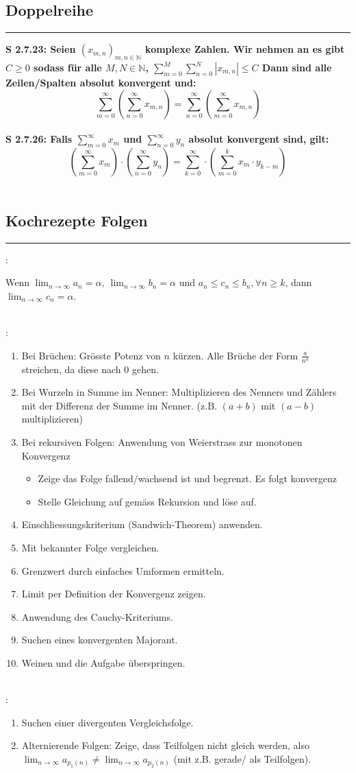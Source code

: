 \documentclass[7pt,landscape, margin = 0.1mm]{article}
\def\limn{\lim_{n\to \infty}}
\newcommand*{\mysubsection}[1]{\vspace{-2mm}\color{chaptercolor}\subsection{ #1 }
\vspace{-1mm}\hrule\vspace{1.5mm}\color{black}
\vspace{2mm}}
\newcommand{\KRZ}[2]{\vspace{1mm} \hline \vspace{1mm} \color{chaptercolor}{RC #1}:\color{black} \   \hspace{0.2cm}\vspace{1mm}   {\begin{minipage}{20em}
#2 \end{minipage}} \vspace{1mm}  \hline \vspace{1mm}  \\}
\newcommand{\SA}[2]{\color{chaptercolor}\bf{S #1}:\color{black}    \hspace{0.2cm} #2 \\}
\begin{document}
\begin{multicols}{4}
\begin{flushleft}
{\begin{itemize}
\end{itemize}}
\mysubsection{Doppelreihe}
\SA{2.7.23}{Seien $(x_{m,n})_{m,n \in \mathbb{N}}$ komplexe Zahlen. Wir nehmen an es gibt $C \geq 0$ sodass für alle $M,N \in \mathbb{N}$,
$ \sum_{m=0}^{M} \sum_{n=0}^{N} |x_{m,n}|\leq C $
Dann sind alle Zeilen/Spalten absolut konvergent und:
$$ \sum_{m=0}^{\infty} \left(\sum_{n=0}^{\infty} x_{m,n} \right) \overset{\underset{\mathrm{}}{}}{=} \sum_{n=0}^{\infty} \left(\sum_{m=0}^{\infty} x_{m,n} \right) $$}
\SA{2.7.26}{Falls $\sum_{m=0}^{\infty } x_m$ und $\sum_{n=0}^{\infty } y_n$ absolut konvergent sind, gilt:
$$ \left(\sum_{m=0}^{\infty } x_m \right) \cdot \left(\sum_{n=0}^{\infty } y_n \right) =\sum_{k=0}^{\infty } \cdot \left(\sum_{m=0}^{k } x_m \cdot y_{k-m} \right) $$}

\mysubsection{Kochrezepte Folgen}
\KRZ{Squeeze-Theorem}{Wenn $\lim_{n \to \infty} a_n = \alpha, \ \lim_{n \to \infty} b_n = \alpha$ und $a_n \le c_n \le b_n, \forall n \ge k$, dann $\lim_{n \to \infty} c_n = \alpha$.}
\KRZ{Konvergenz von Folgen}{\begin{enumerate}
 \item Bei Brüchen: Grösste Potenz von $n$ kürzen. Alle Brüche der Form $\frac{a}{n^a}$ streichen, da diese nach 0 gehen.
 \item Bei Wurzeln in Summe im Nenner: Multiplizieren des Nenners und Zählers mit der Differenz der Summe im Nenner. (z.B. $(a+b)$ mit $(a-b)$ multiplizieren)
 \item Bei rekursiven Folgen: Anwendung von Weierstrass zur monotonen Konvergenz
 \begin{itemize}
 \item Zeige das Folge fallend/wachsend ist und begrenzt. Es folgt konvergenz
  \item Stelle Gleichung auf gemäss Rekursion und löse auf.
 \end{itemize}
 \item Einschliessungskriterium (Sandwich-Theorem) anwenden.
 \item Mit bekannter Folge vergleichen.
 \item Grenzwert durch einfaches Umformen ermitteln.
 \item Limit per Definition der Konvergenz zeigen.
 \item Anwendung des Cauchy-Kriteriums.
 \item Suchen eines konvergenten Majorant.
 \item Weinen und die Aufgabe überspringen.
\end{enumerate}}
\KRZ{Divergenz von Folgen}{\begin{enumerate}
 \item Suchen einer divergenten Vergleichsfolge.
 \item Alternierende Folgen: Zeige, dass Teilfolgen nicht gleich werden, also $\limn a_{p_1(n)} \ne \limn a_{p_2(n)}$ (mit z.B. gerade/ als Teilfolgen).
\end{enumerate}}


\end{flushleft}
\end{multicols}
\end{document}

